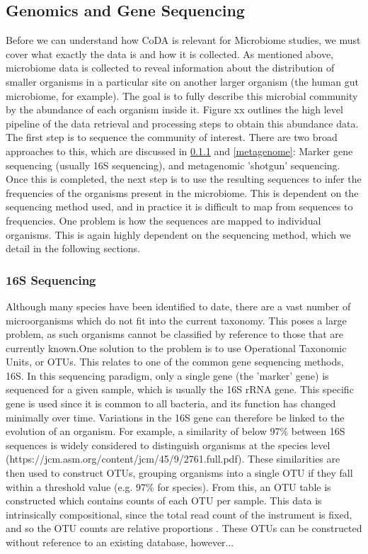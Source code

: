 \subsection{Genomics and Gene Sequencing}
Before we can understand how CoDA is relevant for Microbiome studies, we must cover what exactly the data is and how it is collected. As mentioned above, microbiome data is collected to reveal information about the distribution of smaller organisms in a particular site on another larger organism (the human gut microbiome, for example). The goal is to fully describe this microbial community by the abundance of each organism inside it. Figure xx outlines the high level pipeline of the data retrieval and processing steps to obtain this abundance data. The first step is to sequence the community of interest. There are two broad approaches to this, which are discussed in \ref{16s} and \ref{metagenome}: Marker gene sequencing (usually 16S sequencing), and metagenomic 'shotgun' sequencing. Once this is completed, the next step is to use the resulting sequences to infer the frequencies of the organisms present in the microbiome. This is dependent on the sequencing method used, and in practice it is difficult to map from sequences to frequencies. One problem is how the sequences are mapped to individual organisms. This is again highly dependent on the sequencing method, which we detail in the following sections. 



\subsubsection{16S Sequencing}
\label{16s}
Although many species have been identified to date, there are a vast number of microorganisms which do not fit into the current taxonomy. This poses a large problem, as such organisms cannot be classified by reference to those that are currently known.One solution to the problem is to use Operational Taxonomic Units, or OTUs. This relates to one of the common gene sequencing methods, 16S. In this sequencing paradigm, only a single gene (the 'marker' gene) is sequenced for a given sample, which is usually the 16S rRNA gene. This specific gene is used since it is common to all bacteria, and its function has changed minimally over time. Variations in the 16S gene can therefore be linked to the evolution of an organism. For example, a similarity of below 97\% between 16S sequences is widely considered to distinguish organisms at the species level (https://jcm.asm.org/content/jcm/45/9/2761.full.pdf). These similarities are then used to construct OTUs, grouping organisms into a single OTU if they fall within a threshold value (e.g. 97\% for species). From this, an OTU table is constructed which contains counts of each OTU per sample. This data is intrinsically compositional, since the total read count of the instrument is fixed, and so the OTU counts are relative proportions \citep{Gloor2017}. These OTUs can be constructed without reference to an existing database, however...


